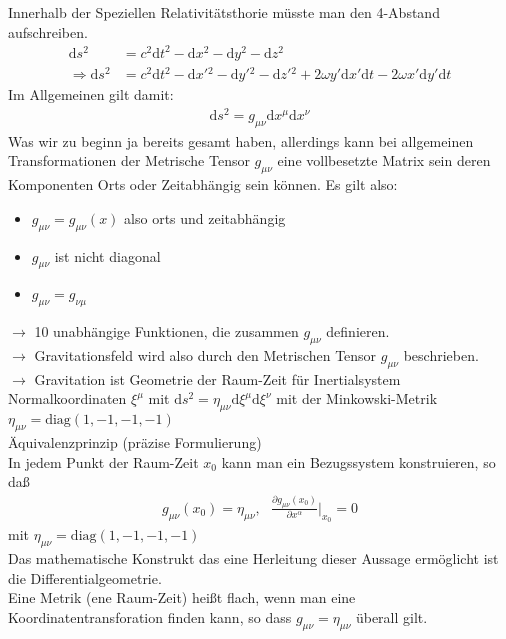 \documentclass[a4paper]{article}
\begin{document}
Innerhalb der Speziellen Relativitätsthorie müsste man den 4-Abstand
aufschreiben. 
\begin{align}
\mathrm{d}s^2&=c^2\mathrm{d}t^2-\mathrm{d}x^2-\mathrm{d}y^2-\mathrm{d}z^2\\
\Rightarrow
\mathrm{d}s^2&=c^2\mathrm{d}t^2-\mathrm{d}x'{}^2-\mathrm{d}y'{}^2-
\mathrm{d}z'{}^2+2\omega y'\mathrm{d}x'\mathrm{d}t -2\omega x'
\mathrm{d}y'\mathrm{d}t
\end{align}
Im Allgemeinen gilt damit:
\begin{align}
\mathrm{d}s^2=g_{\mu\nu}\mathrm{d}x^\mu\mathrm{d}x^\nu
\end{align}
Was wir zu beginn ja bereits gesamt haben, allerdings kann bei allgemeinen
Transformationen der Metrische Tensor $g_{\mu\nu}$ eine vollbesetzte Matrix sein
deren Komponenten Orts oder Zeitabhängig sein können. Es gilt also:
\begin{itemize}
  \item $g_{\mu\nu}=g_{\mu\nu}(x)$ also orts und zeitabhängig
  \item $g_{\mu\nu}$ ist nicht diagonal
  \item $g_{\mu\nu}=g_{\nu\mu}$
\end{itemize}
$\rightarrow$ 10 unabhängige Funktionen, die zusammen $g_{\mu\nu}$ definieren.\\
$\rightarrow$ Gravitationsfeld wird also durch den Metrischen Tensor
$g_{\mu\nu}$ beschrieben.\\
$\rightarrow$ Gravitation ist Geometrie der Raum-Zeit
für Inertialsystem\\
Normalkoordinaten $\xi^\mu$ mit $\mathrm{d}s^2=\eta_{\mu\nu}\mathrm{d}
\xi^\mu\mathrm{d}\xi^\nu$ mit der Minkowski-Metrik
$\eta_{\mu\nu}=\text{diag}(1,-1,-1,-1)$\\
Äquivalenzprinzip (präzise Formulierung)\\
In jedem Punkt der Raum-Zeit $x_0$ kann man ein Bezugssystem konstruieren, so
daß
\begin{align}
g_{\mu\nu}(x_0)=\eta_{\mu\nu}, \ \ \ \frac{\partial g_{\mu\nu}(x_0)}{\partial
x^\alpha}\Big|_{x_0}=0
\end{align}
mit $\eta_{\mu\nu}=\text{diag}(1,-1,-1,-1)$\\
Das mathematische Konstrukt das eine Herleitung dieser Aussage ermöglicht ist
die Differentialgeometrie.\\
Eine Metrik (ene Raum-Zeit) heißt flach, wenn man eine Koordinatentransforation
finden kann, so dass $g_{\mu\nu}=\eta_{\mu\nu}$ überall gilt.\\
\end{document}
